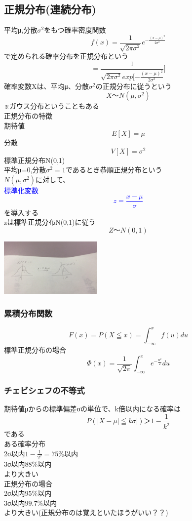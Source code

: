 \documentclass{jsarticle}
\begin{document}
\subsection{正規分布(連続分布)}
	平均μ,分散$σ^2$をもつ確率密度関数
	\[
		f(x)=\frac{1}{\sqrt{2πσ^2}}e^{-\frac{(x-μ)^2}{2σ^2}}
	\]
	で定められる確率分布を正規分布という
	\[
		=\frac{1}{\sqrt{2πσ^2}exp[-\frac{(x-μ)^2}{2σ^2}}]
	\]
	確率変数Xは、平均μ、分散$σ^2$の正規分布に従うという
	\[
		X〜Ν(μ,σ^2)
	\]
	※ガウス分布ということもある\\
	
	正規分布の特徴 \\
	期待値 
		\[
			E[X]=μ
		\]
	分散
		\[
			V[X]=σ^2
		\]
	{\large{標準正規分布N(0,1)}}\\
	平均μ=0,分散$σ^2=1$であるとき恭順正規分布という\\
	$Ν(μ,σ^2)$に対して、\\
	\textcolor{blue}{標準化変数
	\[
		z=\frac{x-μ}{σ}
	\]
	}
	を導入する\\
	zは標準正規分布N(0,1)に従う\\
	\[
		Z〜N(0,1)
	\]
	\begin{center}
		\includegraphics[width=5cm]{11_9_1.JPG}
	\end{center}
	\subsubsection{累積分布関数}
		\[	
			F(x)=P(X≦x)=\int^x_{-∞}f(u) du
		\]
		標準正規分布の場合
		\[
			Φ(x)=\frac{1}{\sqrt{2π}}\int^x_{-∞}e^{-\frac{u^2}{2}}du
		\]
	\subsubsection{チェビシェフの不等式}
		期待値μからの標準偏差σの単位で、k倍以内になる確率は
		\[
			P(|X-μ|≦kσ|)＞1-\frac{1}{k^2} 
		\]
		である\\
		ある確率分布\\
		2σ以内$1-\frac{1}{2^2}=75\%$以内\\
		3σ以内$88\%$以内\\
		より大きい\\
		正規分布の場合\\
		2σ以内$95\%$以内\\
		3σ以内$99.7\%$以内\\
		より大きい(正規分布のは覚えといたほうがいい？？)\\
\end{document}
